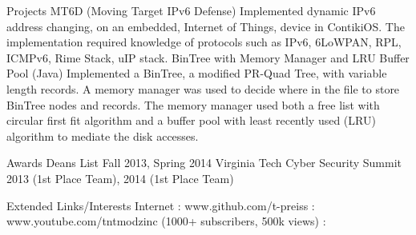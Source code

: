 \documentclass{article}
\begin{document}
Projects 
MT6D (Moving Target IPv6 Defense)
Implemented dynamic IPv6 address changing, on an embedded, Internet of Things, device in ContikiOS. The implementation required knowledge of protocols such as IPv6, 6LoWPAN, RPL, ICMPv6, Rime Stack, uIP stack.	
BinTree with Memory Manager and LRU Buffer Pool (Java)
Implemented a BinTree, a modified PR-Quad Tree, with variable length records. A memory manager was used to decide where in the file to store BinTree nodes and records. The memory manager used both a free list with circular first fit algorithm and a buffer pool with least recently used (LRU) algorithm to mediate the disk accesses.

Awards
Deans List Fall 2013, Spring 2014                  
Virginia Tech Cyber Security Summit 2013 (1st Place Team), 2014 (1st Place Team)

Extended Links/Interests
Internet : www.github.com/t-preiss  :  www.youtube.com/tntmodzinc  (1000+ subscribers, 500k views) :
\end{document}
